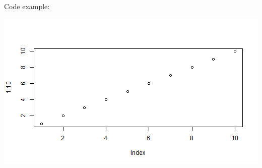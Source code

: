 Code example:

\begin{Shaded}
\begin{Highlighting}[]
\StringTok{ }
\StringTok{ }
\end{Highlighting}
\end{Shaded}

\begin{Shaded}
\begin{Highlighting}[]
\NormalTok{(}\NormalTok{:}\NormalTok{)}
\end{Highlighting}
\end{Shaded}

\includegraphics[width=\linewidth]{figs/codeExample/unnamed-chunk-2-1}
